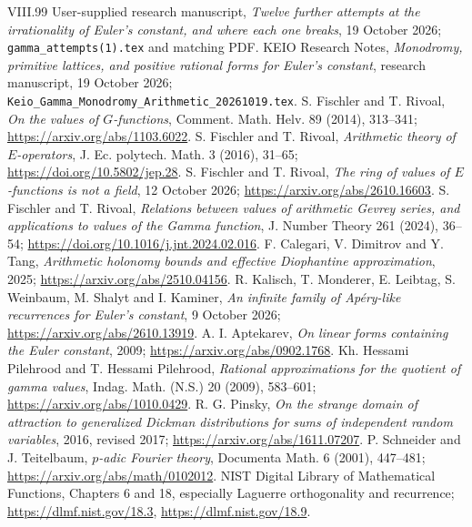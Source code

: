 \documentclass[11pt,a4paper]{article}
\theoremstyle{definition}
\theoremstyle{remark}
\numberwithin{equation}{section}
\renewcommand{\thesection}{\Roman{part}.\arabic{section}}
\renewcommand{\theHsection}{\arabic{part}.main.\arabic{section}}
\begin{document}
\begin{thebibliography}{VIII.99}
 User-supplied research manuscript,
\emph{Twelve further attempts at the irrationality of Euler's constant,
and where each one breaks}, 19 October 2026;
\texttt{gamma\_attempts(1).tex} and matching PDF.
 KEIO Research Notes,
\emph{Monodromy, primitive lattices, and positive rational forms
for Euler's constant},
research manuscript, 19 October 2026;
\texttt{Keio\_Gamma\_Monodromy\_Arithmetic\_20261019.tex}.
 S. Fischler and T. Rivoal,
\emph{On the values of $G$-functions}, Comment. Math. Helv. 89 (2014),
313--341; \url{https://arxiv.org/abs/1103.6022}.
 S. Fischler and T. Rivoal,
\emph{Arithmetic theory of $E$-operators}, J. Ec. polytech. Math.
3 (2016), 31--65; \url{https://doi.org/10.5802/jep.28}.
 S. Fischler and T. Rivoal,
\emph{The ring of values of $E$-functions is not a field},
12 October 2026; \url{https://arxiv.org/abs/2610.16603}.
 S. Fischler and T. Rivoal,
\emph{Relations between values of arithmetic Gevrey series, and
applications to values of the Gamma function}, J. Number Theory
261 (2024), 36--54; \url{https://doi.org/10.1016/j.jnt.2024.02.016}.
 F. Calegari, V. Dimitrov and Y. Tang,
\emph{Arithmetic holonomy bounds and effective Diophantine approximation},
2025; \url{https://arxiv.org/abs/2510.04156}.
 R. Kalisch, T. Monderer, E. Leibtag, S. Weinbaum,
M. Shalyt and I. Kaminer,
\emph{An infinite family of Ap\'ery-like recurrences for Euler's constant},
9 October 2026; \url{https://arxiv.org/abs/2610.13919}.
 A. I. Aptekarev,
\emph{On linear forms containing the Euler constant}, 2009;
\url{https://arxiv.org/abs/0902.1768}.
 Kh. Hessami Pilehrood and T. Hessami Pilehrood,
\emph{Rational approximations for the quotient of gamma values},
Indag. Math. (N.S.) 20 (2009), 583--601;
\url{https://arxiv.org/abs/1010.0429}.
 R. G. Pinsky,
\emph{On the strange domain of attraction to generalized Dickman
distributions for sums of independent random variables},
2016, revised 2017; \url{https://arxiv.org/abs/1611.07207}.
 P. Schneider and J. Teitelbaum,
\emph{$p$-adic Fourier theory}, Documenta Math. 6 (2001), 447--481;
\url{https://arxiv.org/abs/math/0102012}.
 NIST Digital Library of Mathematical Functions,
Chapters 6 and 18, especially Laguerre orthogonality and recurrence;
\url{https://dlmf.nist.gov/18.3}, \url{https://dlmf.nist.gov/18.9}.
\end{thebibliography}
\label{part6:end}
\clearpage
\setcounter{section}{0}\setcounter{subsection}{0}
\renewcommand{\thesection}{\Roman{part}.\arabic{section}}
\renewcommand{\theHsection}{\arabic{part}.main.\arabic{section}}
\renewcommand{\refname}{References for Part VII}
\end{document}
